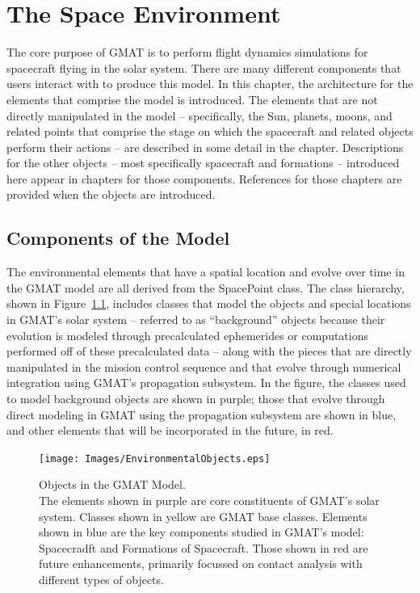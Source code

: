 \chapter{\label{chapter:SolarSystem}The Space Environment}

The core purpose of GMAT is to perform flight dynamics simulations for spacecraft flying in the
solar system.  There are many different components that users interact with to produce this model.
In this chapter, the architecture for the elements that comprise the model is introduced.  The
elements that are not directly manipulated in the model -- specifically, the Sun, planets, moons,
and related points that comprise the stage on which the spacecraft and related objects perform
their actions -- are described in some detail in the chapter.  Descriptions for the other objects
-- most specifically spacecraft and formations -- introduced here appear in chapters for those
components.  References for those chapters are provided when the objects are introduced.

\section{Components of the Model}

The environmental elements that have a spatial location and evolve over time in the GMAT model are
all derived from the SpacePoint class.  The class hierarchy, shown in
Figure~\ref{figure:EnvironmentalObjects}, includes classes that model the objects and
special locations in GMAT's solar system -- referred to as ``background'' objects because their
evolution is modeled through precalculated ephemerides or computations performed off of these
precalculated data -- along with the pieces that are directly manipulated in the mission control
sequence and that evolve through numerical integration using GMAT's propagation subsystem.  In the
figure, the classes used to model background objects are shown in purple; those that evolve through
direct modeling in GMAT using the propagation subsystem are shown in blue, and other elements that
will be incorporated in the future, in red.

\begin{figure}[htb]
\begin{center}
\texttt{[image: Images/EnvironmentalObjects.eps]}
\caption[Objects in the GMAT Model]{\label{figure:EnvironmentalObjects}Objects in the GMAT
Model.\\The elements shown in purple are core constituents of GMAT's solar system.  Classes
shown in yellow are GMAT base classes.  Elements shown in blue are the key components
studied in GMAT's model: Spacecradft and Formations of Spacecraft.  Those shown in red are future
enhancements, primarily focussed on contact analysis with different types of objects.}
\end{center}
\end{figure}

